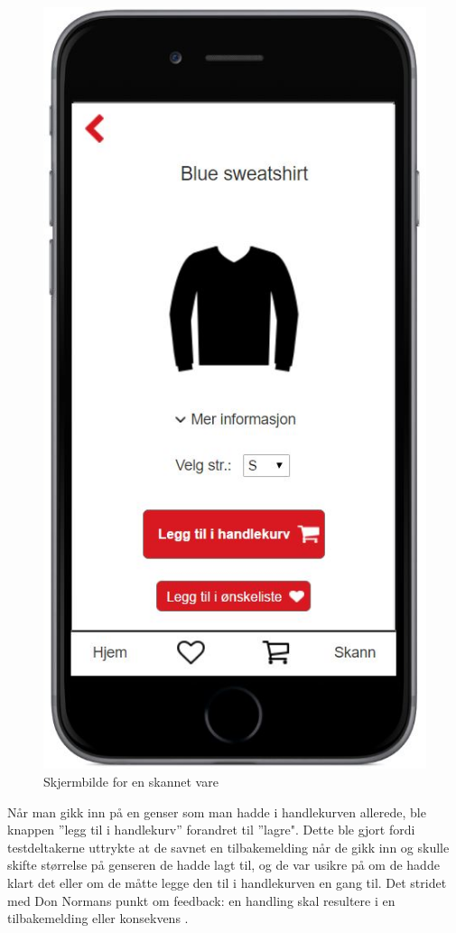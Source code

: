 \begin{figure}[H]
\includegraphics[scale=0.466]{images/axurebilder/genser.JPG}
\centering %
\caption{Skjermbilde for en skannet vare}
\label{fig:vare-skjerm}
\end{figure}

\noindent Når man gikk inn på en genser som man hadde i handlekurven allerede, ble knappen ''legg til i handlekurv'' forandret til ''lagre". Dette ble gjort fordi testdeltakerne uttrykte at de savnet en tilbakemelding når de gikk inn og skulle skifte størrelse på genseren de hadde lagt til, og de var usikre på om de hadde klart det eller om de måtte legge den til i handlekurven en gang til. Det stridet med Don Normans punkt om feedback: en handling skal resultere i en tilbakemelding eller konsekvens  \cite[p.~27]{preece}.

